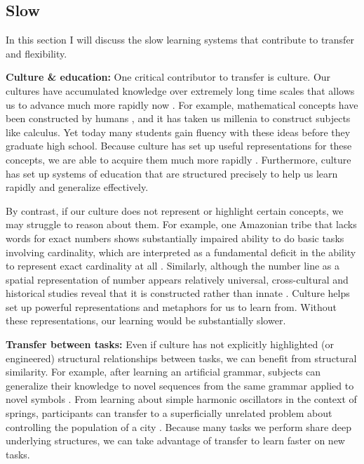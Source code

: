 \subsection{Slow}
In this section I will discuss the slow learning systems that contribute to transfer and flexibility. \par
\textbf{Culture \& education:} One critical contributor to transfer is culture. Our cultures have accumulated knowledge over extremely long time scales that allows us to advance much more rapidly now \citep{Tomasello1993, Bengio2012}. For example, mathematical concepts have been constructed by humans \citep{Hersh1997, MacLane1986}, and it has taken us millenia to construct subjects like calculus. Yet today many students gain fluency with these ideas before they graduate high school. Because culture has set up useful representations for these concepts, we are able to acquire them much more rapidly \citep[e.g.][]{McClelland2016}. Furthermore, culture has set up systems of education that are structured precisely to help us learn rapidly and generalize effectively. \par 
By contrast, if our culture does not represent or highlight certain concepts, we may struggle to reason about them. For example, one Amazonian tribe that lacks words for exact numbers shows substantially impaired ability to do basic tasks involving cardinality, which are interpreted as a fundamental deficit in the ability to represent exact cardinality at all \citep{Gordon2004}. Similarly, although the number line as a spatial representation of number appears relatively universal, cross-cultural and historical studies reveal that it is constructed rather than innate \citep{Nunez2011}. Culture helps set up powerful representations and metaphors for us to learn from. Without these representations, our learning would be substantially slower. \par 
\textbf{Transfer between tasks:} Even if culture has not explicitly highlighted (or engineered) structural relationships between tasks, we can benefit from structural similarity. For example, after learning an artificial grammar, subjects can generalize their knowledge to novel sequences from the same grammar applied to novel symbols \citep[e.g.][]{Tunney2001}. From learning about simple harmonic oscillators in the context of springs, participants can transfer to a superficially unrelated problem about controlling the population of a city \citep[e.g.][]{Day2011}. Because many tasks we perform share deep underlying structures, we can take advantage of transfer to learn faster on new tasks. \par 
